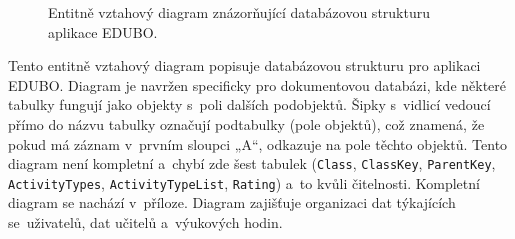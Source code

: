 \documentclass[male,czech,api_bc]{kitheses}
\begin{document}
\begin{figure}[H]
	\centering
	\caption{Entitně vztahový diagram znázorňující databázovou strukturu aplikace EDUBO.}
	\label{fig:erd-1}
\end{figure}

Tento entitně vztahový diagram popisuje databázovou strukturu pro aplikaci EDUBO. Diagram je navržen specificky pro dokumentovou databázi, kde některé tabulky fungují jako objekty s~poli dalších podobjektů. Šipky s~vidlicí vedoucí přímo do názvu tabulky označují podtabulky (pole objektů), což znamená, že pokud má záznam v~prvním sloupci „A“, odkazuje na pole těchto objektů. Tento diagram není kompletní a~chybí zde šest tabulek (\texttt{Class}, \texttt{ClassKey}, \texttt{ParentKey}, \texttt{ActivityTypes}, \texttt{ActivityTypeList}, \texttt{Rating}) a~to kvůli čitelnosti. Kompletní diagram se nachází v~příloze. Diagram zajišťuje organizaci dat týkajících se~uživatelů, dat učitelů a~výukových hodin.
\end{document}
